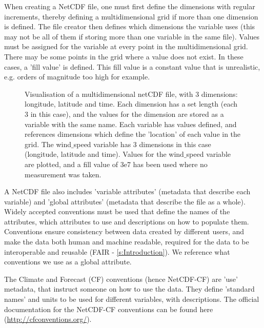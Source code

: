 \documentclass[a4paper,english, 11pt]{article}
\begin{document}
When creating a NetCDF file, one must first define the dimensions with regular increments, thereby defining a multidimensional grid if more than one dimension is defined. The file creator then defines which dimensions the variable uses (this may not be all of them if storing more than one variable in the same file). Values must be assigned for the variable at every point in the multidimensional grid. There may be some points in the grid where a value does not exist. In these cases, a 'fill value' is defined. This fill value is a constant value that is unrealistic, e.g. orders of magnitude too high for example.

\begin{figure}[htb]
    \caption{\label{fig:netcdf}
        Visualisation of a multidimensional netCDF file, with 3 dimensions: longitude, latitude and time.
        Each dimension has a set length (each 3 in this case), and the values
        for the dimension are stored as a variable with the same name.
        Each variable has values defined, and references dimensions which define the 'location' of each value in the grid. The wind$\_$speed variable has 3 dimensions in this case (longitude, latitude and time). Values for the wind$\_$speed variable are plotted, and a fill value of 3e7 has been used where no measurement was taken. 
    }
\end{figure}

A NetCDF file also includes 'variable attributes' (metadata that describe each variable) and 'global attributes' (metadata that describe the file as a whole). Widely accepted conventions must be used that define the names of the attributes, which attributes to use and descriptions on how to populate them. Conventions ensure consistency between data created by different users, and make the data both human and machine readable, required for the data to be interoperable and reusable (FAIR - \ref{s:Introduction}). We reference what conventions we use as a global attribute. 

The Climate and Forecast (CF) conventions (hence NetCDF-CF) are 'use' metadata, that instruct someone on how to use the data. They define 'standard names' and units to be used for different variables, with descriptions. The official documentation for the NetCDF-CF conventions can be found here (\url{http://cfconventions.org/}).
\end{document}
